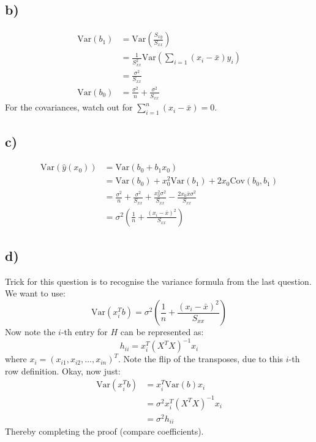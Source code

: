 \documentclass{article}
\begin{document}
\subsection*{b)}
\begin{align*}
    \text{Var}(b_1) &= \text{Var}\left(\frac{S_{xy}}{S_{xx}}\right) \\ 
    &= \frac{1}{S_{xx}^2}\text{Var}\left(\sum_{i=1}(x_i - \bar{x})y_i\right)  \\ 
    &= \frac{\sigma^2}{S_{xx}}\\
    \text{Var}(b_0) &= \frac{\sigma^2}{n} + \frac{\sigma^2}{S_{xx}}
\end{align*}
For the covariances, watch out for $\sum_{i=1}^n(x_i - \bar{x}) = 0$.
\subsection*{c)}
\begin{align*}
    \text{Var}(\hat{y}(x_0)) &= \text{Var}(b_0 + b_1x_0) \\ 
    &= \text{Var}(b_0) + x_0^2\text{Var}(b_1) + 2x_0\text{Cov}(b_0, b_1) \\ 
    &= \frac{\sigma^2}{n} + \frac{\sigma^2}{S_{xx}} + \frac{x_0^2\sigma^2}{S_{xx}} - \frac{2x_0\bar{x}\sigma^2}{S_{xx}} \\ 
    &= \sigma^2\left(\frac{1}{n} + \frac{(x_i - \bar{x})^2}{S_{xx}}\right)
\end{align*}

\newpage 
\subsection*{d)}
Trick for this question is to recognise the variance formula from the last question. We want to use:
$$ \text{Var}(x_i^Tb) = \sigma^2\left(\frac{1}{n} + \frac{(x_i - \bar{x})^2}{S_{xx}}\right)$$
Now note the $i$-th entry for $H$ can be represented as:
$$ h_{ii} = x_i^T(X^TX)^{-1}x_i $$
where $x_i = (x_{i1}, x_{i2}, \dots, x_{in})^T$. Note the flip of the transposes, due to this $i$-th 
row definition. 
Okay, now just:
\begin{align*}
    \text{Var}(x_i^Tb) &= x_i^T\text{Var}(b)x_i \\ 
    &= \sigma^2x_i^T(X^TX)^{-1}x_i \\ 
    &= \sigma^2h_{ii}
\end{align*}
Thereby completing the proof (compare coefficients).
\end{document}
